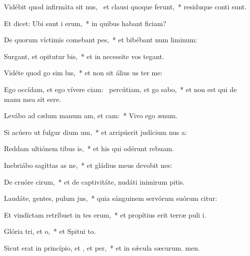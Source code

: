 \item Vidébit quod infirmáta sit nus,~\pscross{} et clausi quoque ferunt,~* residuque conti sunt.
\item Et dicet: Ubi sunt i erum,~* in quibus habant ficiam?
\item De quorum víctimis comebant pes,~* et bibébant num liminum:
\item Surgant, et opitutur bis,~* et in necessite vos tegant.
\item Vidéte quod go sim lus,~* et non sit álius us ter me:
\item Ego occídam, et ego vívere ciam:~\pscross{} percútiam, et go sabo,~* et non est qui de manu mea sit eere.
\item Levábo ad cælum manum am, et cam:~* Vivo ego  ænum.
\item Si acúero ut fulgur dium um,~* et arripúerit judícium nus a:
\item Reddam ultiónem tibus is,~* et his qui odérunt  rebuam.
\item Inebriábo sagíttas as ne,~* et gládius meus devobit nes:
\item De cruóre cirum,~* et de captivitáte, nudáti inimirum pitis.
\item Laudáte, gentes, pulum jus,~* quia sánguinem servórum suórum citur:
\item Et vindíctam retríbuet in tes erum,~* et propítius erit terræ puli i.
\item \singlecolsep
\item Glória tri, et o,~* et Spitui to.
\item Sicut erat in princípio, et , et per,~* et in sǽcula sæcurum. men.

